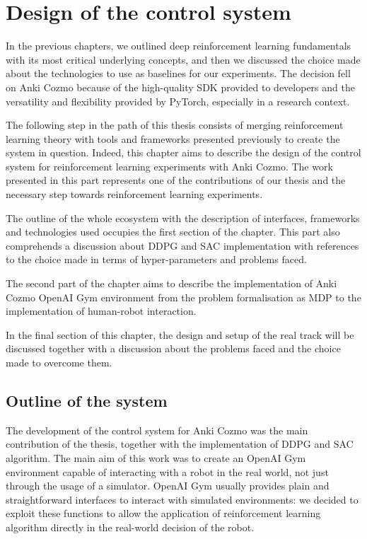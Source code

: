 \chapter{Design of the control system} \label{ch4}

In the previous chapters, we outlined deep reinforcement learning fundamentals with its most critical underlying concepts, and then we discussed the choice made about the technologies to use as baselines for our experiments. The decision fell on Anki Cozmo because of the high-quality SDK provided to developers and the versatility and flexibility provided by PyTorch, especially in a research context.

The following step in the path of this thesis consists of merging reinforcement learning theory with tools and frameworks presented previously to create the system in question. Indeed, this chapter aims to describe the design of the control system for reinforcement learning experiments with Anki Cozmo. The work presented in this part represents one of the contributions of our thesis and the necessary step towards reinforcement learning experiments.

The outline of the whole ecosystem with the description of interfaces, frameworks and technologies used occupies the first section of the chapter. This part also comprehends a discussion about DDPG \cite{lillicrap2015continuous} and SAC \cite{haarnoja2018soft, haarnoja2018alg} implementation with references to the choice made in terms of hyper-parameters and problems faced.

The second part of the chapter aims to describe the implementation of Anki Cozmo OpenAI Gym environment from the problem formalisation as MDP to the implementation of human-robot interaction.

In the final section of this chapter, the design and setup of the real track will be discussed together with a discussion about the problems faced and the choice made to overcome them.

\section{Outline of the system}

The development of the control system for Anki Cozmo was the main contribution of the thesis, together with the implementation of DDPG and SAC algorithm. The main aim of this work was to create an OpenAI Gym environment capable of interacting with a robot in the real world, not just through the usage of a simulator. OpenAI Gym usually provides plain and straightforward interfaces to interact with simulated environments: we decided to exploit these functions to allow the application of reinforcement learning algorithm directly in the real-world decision of the robot.

